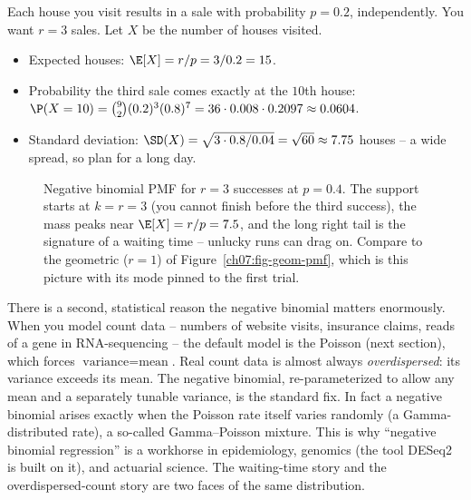 \begin{example}
\label{ch07:ex-sales}
Each house you visit results in a sale with probability $p = 0.2$, independently.
You want $r = 3$ sales. Let $X$ be the number of houses visited.
\begin{itemize}
\item Expected houses: $\E[X] = r/p = 3/0.2 = 15$.
\item Probability the third sale comes exactly at the $10$th house:
  $\P(X = 10) = \binom{9}{2}(0.2)^3 (0.8)^7
  = 36 \cdot 0.008 \cdot 0.2097 \approx 0.0604$.
\item Standard deviation: $\SD(X) = \sqrt{3 \cdot 0.8 / 0.04}
  = \sqrt{60} \approx 7.75$ houses -- a wide spread, so plan for a long day.
\end{itemize}
\end{example}

\begin{figure}[H]
\centering
{}
\caption{Negative binomial PMF for $r=3$ successes at $p=0.4$. The support starts
at $k=r=3$ (you cannot finish before the third success), the mass peaks near
$\E[X]=r/p=7.5$, and the long right tail is the signature of a waiting time --
unlucky runs can drag on. Compare to the geometric ($r=1$) of
Figure~\ref{ch07:fig-geom-pmf}, which is this picture with its mode pinned to the
first trial.}
\label{ch07:fig-negbinom-pmf}
\end{figure}

\begin{applicationbox}
There is a second, statistical reason the negative binomial matters enormously.
When you model count data -- numbers of website visits, insurance claims, reads of
a gene in RNA-sequencing -- the default model is the Poisson (next section), which
forces $\text{variance} = \text{mean}$. Real count data is almost always
\emph{overdispersed}: its variance exceeds its mean. The negative binomial,
re-parameterized to allow any mean and a separately tunable variance, is the
standard fix. In fact a negative binomial arises exactly when the Poisson rate
itself varies randomly (a Gamma-distributed rate), a so-called Gamma--Poisson
mixture. This is why ``negative binomial regression'' is a workhorse in
epidemiology, genomics (the tool DESeq2 is built on it), and actuarial science.
The waiting-time story and the overdispersed-count story are two faces of the same
distribution.
\end{applicationbox}

